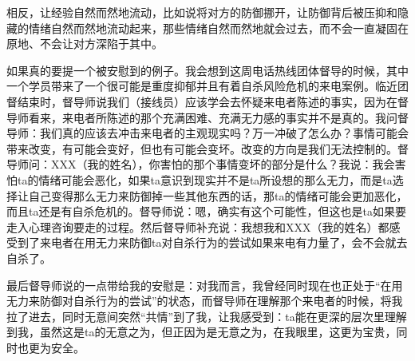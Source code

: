 相反，让经验自然而然地流动，比如说将对方的防御挪开，让防御背后被压抑和隐藏的情绪自然而然地流动起来，那些情绪自然而然地就会过去，而不会一直凝固在原地、不会让对方深陷于其中。


如果真的要提一个被安慰到的例子。我会想到这周电话热线团体督导的时候，其中一个学员带来了一个很可能是重度抑郁并且有着自杀风险危机的来电案例。临近团督结束时，督导师说我们（接线员）应该学会去怀疑来电者陈述的事实，因为在督导师看来，来电者所陈述的那个充满困难、充满无力感的事实并不是真的。我问督导师：我们真的应该去冲击来电者的主观现实吗？万一冲破了怎么办？事情可能会带来改变，有可能会变好，但也有可能会变坏。改变的方向是我们无法控制的。督导师问：XXX（我的姓名），你害怕的那个事情变坏的部分是什么？我说：我会害怕ta的情绪可能会恶化，如果ta意识到现实并不是ta所设想的那么无力，而是ta选择让自己变得那么无力来防御掉一些其他东西的话，那ta的情绪可能会更加恶化，而且ta还是有自杀危机的。督导师说：嗯，确实有这个可能性，但这也是ta如果要走入心理咨询要走的过程。然后督导师补充说：我想我和XXX（我的姓名）都感受到了来电者在用无力来防御ta对自杀行为的尝试\pozhehao{}如果来电有力量了，会不会就去自杀了。

最后督导师说的一点带给我的安慰是：对我而言，我曾经同时现在也正处于“在用无力来防御对自杀行为的尝试”的状态，而督导师在理解那个来电者的时候，将我拉了进去，同时无意间突然“共情”到了我，让我感受到：ta能在更深的层次里理解到我，虽然这是ta的无意之为，但正因为是无意之为，在我眼里，这更为宝贵，同时也更为安全。

